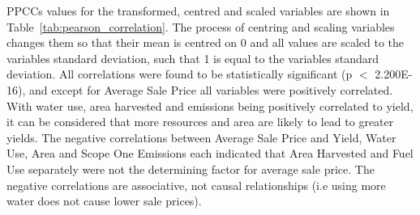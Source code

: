 \documentclass[10pt,letterpaper]{article}
\begin{document}
PPCCs values for the transformed, centred and scaled variables are shown in Table~\ref{tab:pearson_correlation}. The process of centring and scaling variables changes them so that their mean is centred on 0 and all values are scaled to the variables standard deviation, such that 1 is equal to the variables standard deviation. All correlations were found to be statistically significant (p $<$ 2.200E-16), and except for Average Sale Price all variables were positively correlated. With water use, area harvested and emissions being positively correlated to yield, it can be considered that more resources and area are likely to lead to greater yields. The negative correlations between Average Sale Price and Yield, Water Use, Area and Scope One Emissions each indicated that Area Harvested and Fuel Use separately were not the determining factor for average sale price. The negative correlations are associative, not causal relationships (i.e using more water does not cause lower sale prices).
\par
\end{document}
